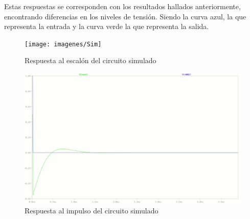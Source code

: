 Estas respuestas se corresponden con los resultados hallados anteriormente, encontrando diferencias en los niveles de tensi\'on. Siendo la curva azul, la  que representa la entrada y la curva verde la que representa la salida.

\begin{figure}[h]
\begin{centering}

	\begin{minipage}[b]{.4\linewidth}
	\centering
	\texttt{[image: imagenes/Sim]}
	\caption{Respuesta al escal\'on del circuito simulado}
	\end{minipage}
	\hfill
	\begin{minipage}[b]{.4\linewidth}
	\centering
	\includegraphics[width=1.3\linewidth]{imagenes/ImpulseSimulacion}
	\caption{Respuesta al impulso del circuito simulado}
	\end{minipage}
\end{centering}
\end{figure}


